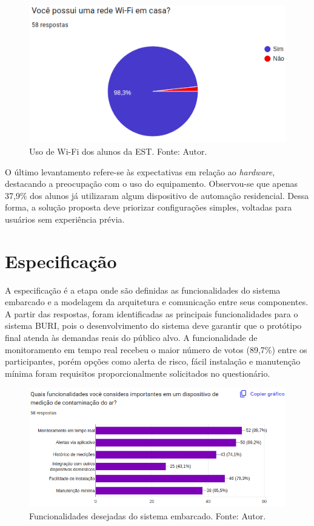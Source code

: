 \begin{figure}[ht]
    \centering
    \includegraphics[width=.67\textwidth]{img/graf1-wifi.png}
    \caption{Uso de Wi-Fi dos alunos da EST. Fonte: Autor.}\label{figWifiAlunos}
\end{figure}

O último levantamento refere-se às expectativas em relação ao \textit{hardware}, destacando a preocupação com o uso do equipamento. Observou-se que apenas 37,9\% dos 
alunos já utilizaram algum dispositivo de automação residencial. Dessa forma, a solução proposta deve priorizar configurações simples, voltadas para usuários 
sem experiência prévia. 


\section{Especificação}\label{fase2}

A especificação é a etapa onde são definidas as funcionalidades do sistema embarcado e a modelagem da arquitetura e comunicação entre 
seus componentes. A partir das respostas, foram identificadas as principais funcionalidades 
para o sistema BURI, pois o desenvolvimento do sistema deve garantir que o protótipo final atenda às demandas reais do
público alvo. A funcionalidade de monitoramento em tempo real recebeu o maior número de votos (89,7\%) entre os participantes, porém opções como alerta de risco, fácil instalação e 
manutenção mínima foram requisitos proporcionalmente solicitados no questionário. 

\begin{figure}[ht]
    \centering
    \includegraphics[width=.77\textwidth]{img/graf1-funcionalidades.png}
    \caption{Funcionalidades desejadas do sistema embarcado. Fonte: Autor.}\label{figFuncionalidades}
\end{figure}

